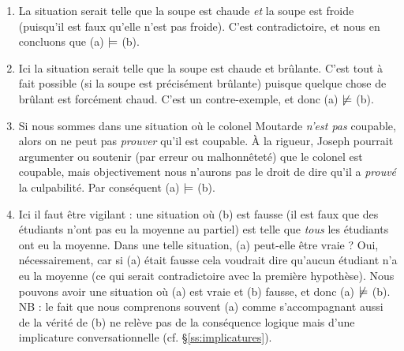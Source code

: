 \begin{exo}
\begin{solu}
\fussy
\begin{enumerate}
\item 
La situation serait telle que la soupe est chaude \emph{et} la soupe est froide (puisqu'il est faux qu'elle n'est pas froide). C'est contradictoire, et nous en concluons que (a) $\mathrel|\mathrel{\mkern -3.5mu}=$ (b).
\item 
Ici la situation serait telle que la soupe est chaude et brûlante. C'est tout à fait possible (si la soupe est précisément brûlante) puisque quelque chose de brûlant est forcément chaud. C'est un contre-exemple, et donc (a) $\not\mathrel|\mathrel{\mkern -3.5mu}=$ (b).
\item 
Si nous sommes dans une situation où le colonel Moutarde \emph{n'est pas} coupable, alors on ne peut pas \emph{prouver} qu'il est coupable. À la rigueur, Joseph pourrait argumenter ou soutenir (par erreur ou malhonnêteté) que le colonel est coupable, mais objectivement nous n'aurons pas le droit de dire qu'il a \emph{prouvé} la culpabilité.  Par conséquent (a) $\mathrel|\mathrel{\mkern -3.5mu}=$ (b).
\item 
Ici il faut être vigilant : une situation où (b) est fausse  (il est faux que des étudiants n'ont pas eu la moyenne au partiel) est telle que \emph{tous} les étudiants ont eu la moyenne.  Dans une telle situation, (a) peut-elle être vraie ? Oui, nécessairement, car si (a) était fausse cela voudrait dire qu'aucun étudiant n'a eu la moyenne (ce qui serait contradictoire avec la première hypothèse).  Nous pouvons avoir une situation où (a) est vraie et (b) fausse, et donc (a) $\not\mathrel|\mathrel{\mkern -3.5mu}=$ (b).
\\
NB : le fait que nous comprenons souvent (a) comme s'accompagnant aussi de la vérité de (b) ne relève pas de la conséquence logique mais d'une implicature conversationnelle (cf. \S\ref{ss:implicatures}).
\end{enumerate}
\end{solu}
\end{exo}
